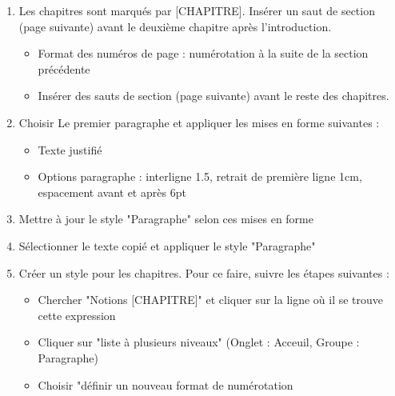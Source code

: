 \documentclass[11pt, a4paper]{article}
\begin{document}
\begin{enumerate}
	\item Les chapitres sont marqués par [CHAPITRE]. Insérer un saut de section (page suivante) avant le deuxième chapitre après l'introduction. 
	\begin{itemize}
		\item Format des numéros de page : numérotation à la suite de la section précédente
		\item Insérer des sauts de section (page suivante) avant le reste des chapitres. 
	\end{itemize}

	\item Choisir Le premier paragraphe et appliquer les mises en forme suivantes : 
	\begin{itemize}
		\item Texte justifié 
		\item Options paragraphe : interligne 1.5, retrait de première ligne 1cm, espacement avant et après 6pt
	\end{itemize}

	\item Mettre à jour le style "Paragraphe" selon ces mises en forme
	\item Sélectionner le texte copié et appliquer le style "Paragraphe"  
	\item Créer un style pour les chapitres. Pour ce faire, suivre les étapes suivantes :  
	\begin{itemize}
		\item Chercher "Notions [CHAPITRE]" et cliquer sur la ligne où il se trouve cette expression 
		\item Cliquer sur "liste à plusieurs niveaux" (Onglet : Acceuil, Groupe : Paragraphe)
		\item Choisir "définir un nouveau format de numérotation 
	\end{itemize}
\end{enumerate}
\end{document}
